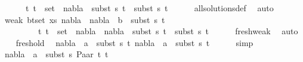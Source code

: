 \begin{isabellebody}
\ \ \ \ \ {\isachardoublequoteopen}{\isasymforall}\ {\isacharparenleft}{\kern0pt}t{}{\isacharcomma}{\kern0pt}\ t{}{\isacharparenright}{\kern0pt}\ {\isasymin}\ set\ {\isacharbrackleft}{\kern0pt}{\isacharbrackright}{\kern0pt}{\isachardot}{\kern0pt}\ nabla{}\ {\isasymturnstile}\ subst\ s{}\ t{}\ {\isasymapprox}\ subst\ s{}\ t{}{\isachardoublequoteclose}\isanewline
\ \ \ \ \isamarkupfalse%
\ all{\isacharunderscore}{\kern0pt}solutions{\isacharunderscore}{\kern0pt}def\ \isamarkupfalse%
\ auto\isanewline
\ \ \isamarkupfalse%
\ weak{}{\isacharcolon}{\kern0pt}\ {\isachardoublequoteopen}{\isasymforall}{\isacharparenleft}{\kern0pt}b{\isacharcomma}{\kern0pt}t{\isacharparenright}{\kern0pt}{\isasymin}set\ xs{\isachardot}{\kern0pt}\ {\isacharparenleft}{\kern0pt}nabla{}\ {\isasymunion}\ nabla{}{\isacharparenright}{\kern0pt}\ {\isasymturnstile}\ b\ {\isasymsharp}\ subst\ s{}\ t{\isachardoublequoteclose}\isanewline
\ \ \ \ \ \ \ \ {\isachardoublequoteopen}{\isasymforall}\ {\isacharparenleft}{\kern0pt}t{}{\isacharcomma}{\kern0pt}\ t{}{\isacharparenright}{\kern0pt}\ {\isasymin}\ set\ {\isacharbrackleft}{\kern0pt}{\isacharbrackright}{\kern0pt}{\isachardot}{\kern0pt}\ {\isacharparenleft}{\kern0pt}nabla{}\ {\isasymunion}\ nabla{}{\isacharparenright}{\kern0pt}\ {\isasymturnstile}\ subst\ s{}\ t{}\ {\isasymapprox}\ subst\ s{}\ t{}{\isachardoublequoteclose}\isanewline
\ \ \ \ \isamarkupfalse%
\ fresh{\isacharunderscore}{\kern0pt}weak\ \isamarkupfalse%
\ auto\isanewline
\ \ \isamarkupfalse%
\ fresh{\isacharunderscore}{\kern0pt}old\ \isamarkupfalse%
\ {\isachardoublequoteopen}nabla{}\ {\isasymturnstile}\ a\ {\isasymsharp}\ subst\ s{}\ t{}{\isachardoublequoteclose}\ {\isachardoublequoteopen}nabla{}\ {\isasymturnstile}\ a\ {\isasymsharp}\ subst\ s{}\ t{}{\isachardoublequoteclose}\isanewline
\ \ \ \ \isamarkupfalse%
\ simp{\isacharplus}{\kern0pt}\isanewline
\ \ \isamarkupfalse%
\ {\isachardoublequoteopen}nabla{}\ {\isasymturnstile}\ a\ {\isasymsharp}\ subst\ s{}\ {\isacharparenleft}{\kern0pt}Paar\ t{}\ t{}{\isacharparenright}{\kern0pt}{\isachardoublequoteclose}\isanewline
\ \ \ \ \isamarkupfalse%

\end{isabellebody}
